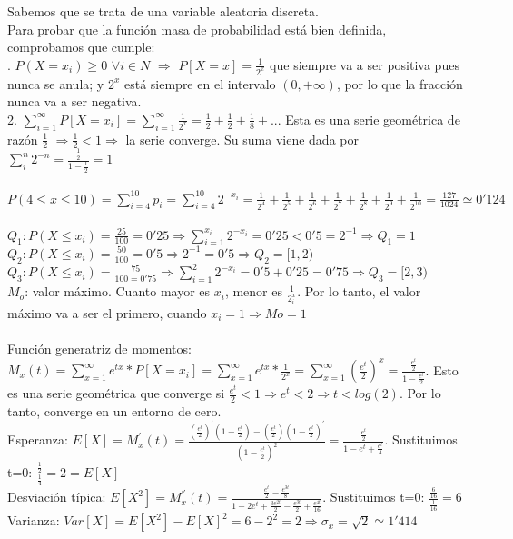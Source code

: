 \problem 
Sabemos que se trata de una variable aleatoria discreta. \\
Para probar que la función masa de probabilidad está bien definida, comprobamos que cumple: \\
. $P(X=x_i)\geq 0$ $\forall i\in N$ $\Rightarrow$ $P[X=x]=\frac{1}{2^x}$ que siempre va a ser positiva pues nunca se anula; y $2^x$ está siempre en el intervalo $(0,+\infty)$, por lo que la fracción nunca va a ser negativa. \\
2. $\sum_{i=1}^{\infty}P[X=x_i]=\sum_{i=1}^{\infty}\frac{1}{2^x} = \frac{1}{2} + \frac{1}{2} + \frac{1}{8} + ... $ Esta es una serie geométrica de razón $\frac{1}{2}$ $\Rightarrow \frac{1}{2} < 1 \Rightarrow$ la serie converge. Su suma viene dada por $\sum_{i}^n 2^{-n} = \frac{\frac{1}{2}}{1-\frac{1}{2}}=1$ \\ \\
\subproblem
$P(4\leq x \leq 10) = \sum^{10}_{i=4} p_i = \sum^{10}_{i=4} 2^{-x_i} = \frac{1}{2^4}+\frac{1}{2^5}+ \frac{1}{2^6} + \frac{1}{2^7} + \frac{1}{2^8} + \frac{1}{2^9}+ \frac{1}{2^{10}} = \frac{127}{1024} \simeq 0'124$ \\ \\
\subproblem
$Q_1: P(X\leq x_i) = \frac{25}{100} = 0'25 \Rightarrow \sum^{x_i}_{i=1} 2^{-x_i} = 0'25 < 0'5 = 2^{-1} \Rightarrow Q_1 = 1$ \\
$Q_2: P(X \leq x_i) = \frac{50}{100} = 0'5 \Rightarrow 2^{-1} = 0'5 \Rightarrow Q_2 = [1,2)$ \\
$Q_3: P(X \leq x_i) = \frac{75}{100 = 0'75} \Rightarrow \sum^2_{i=1} 2^{-x_i} = 0'5 + 0'25 = 0'75 \Rightarrow Q_3 = [2,3)$ \\
$M_o$: valor máximo. Cuanto mayor es $x_i$, menor es $\frac{1}{2^x_i}$. Por lo tanto, el valor máximo va a ser el primero, cuando $x_i = 1 \Rightarrow Mo = 1$ \\ \\
\subproblem
Función generatriz de momentos: $M_x(t) = \sum^\infty_{x=1} e^{tx}*P[X=x_i] = \sum^\infty_{x=1} e^{tx}*\frac{1}{2^x} = \sum^\infty_{x=1} (\frac{e^t}{2})^x = \frac{\frac{e^t}{2}}{1-\frac{e^t}{2}}$. Esto es una serie geométrica que converge si $\frac{e^t}{2} < 1 \Rightarrow e^t < 2 \Rightarrow t < log(2)$. Por lo tanto, converge en un entorno de cero. \\
Esperanza: $E[X] = M^{'} _x(t) = \frac{(\frac{e^t}{2})^{'}(1-\frac{e^t}{2})-(\frac{e^t}{2})(1-\frac{e^t}{2})^{'}}{(1-\frac{e^t}{2})^2} = \frac{\frac{e^t}{2}}{1 - e^t + \frac{e^t}{4}}$. Sustituimos t=0: $\frac{\frac{1}{2}}{\frac{1}{4}} = 2 = E[X]$ \\
Desviación típica: $E[X^2] = M^{''}_x(t) = \frac{\frac{e^t}{2}-\frac{e^{3t}}{8}}{1-2e^t+\frac{3e^{2t}}{2}-\frac{e^{3t}}{2}+\frac{e^{4t}}{16}}$. Sustituimos t=0: $\frac{\frac{6}{16}}{\frac{1}{16}} = 6$ \\
Varianza: $Var[X] = E[X^2]-E[X]^2 = 6-2^2 = 2 \Rightarrow \sigma_x = \sqrt{2} \simeq 1'414$

